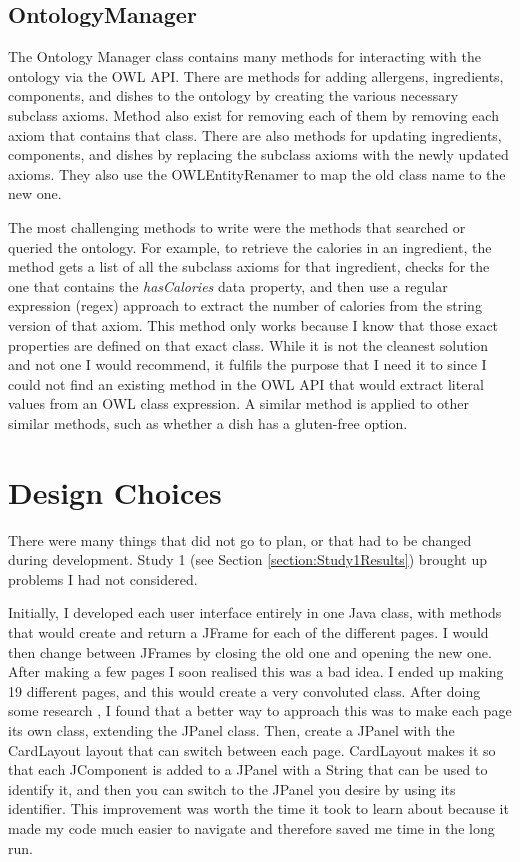 \subsection{OntologyManager}

The Ontology Manager class contains many methods for interacting with the ontology via the OWL API. There are methods for adding allergens, ingredients, components, and dishes to the ontology by creating the various necessary subclass axioms. Method also exist for removing each of them by removing each axiom that contains that class. There are also methods for updating ingredients, components, and dishes by replacing the subclass axioms with the newly updated axioms. They also use the OWLEntityRenamer \cite{owl_api_doc_2023} to map the old class name to the new one.

The most challenging methods to write were the methods that searched or queried the ontology. For example, to retrieve the calories in an ingredient, the method gets a list of all the subclass axioms for that ingredient, checks for the one that contains the \textit{hasCalories} data property, and then use a regular expression (regex) approach to extract the number of calories from the string version of that axiom. This method only works because I know that those exact properties are defined on that exact class. While it is not the cleanest solution and not one I would recommend, it fulfils the purpose that I need it to since I could not find an existing method in the OWL API that would extract literal values from an OWL class expression. A similar method is applied to other similar methods, such as whether a dish has a gluten-free option.

\section{Design Choices}

There were many things that did not go to plan, or that had to be changed during development. Study 1 (see Section \ref{section:Study1Results}) brought up problems I had not considered.

Initially, I developed each user interface entirely in one Java class, with methods that would create and return a JFrame for each of the different pages. I would then change between JFrames by closing the old one and opening the new one. After making a few pages I soon realised this was a bad idea. I ended up making 19 different pages, and this would create a very convoluted class. After doing some research \cite{card_layout_2011}, I found that a better way to approach this was to make each page its own class, extending the JPanel class. Then, create a JPanel with the CardLayout layout that can switch between each page. CardLayout makes it so that each JComponent is added to a JPanel with a String that can be used to identify it, and then you can switch to the JPanel you desire by using its identifier. This improvement was worth the time it took to learn about because it made my code much easier to navigate and therefore saved me time in the long run.

